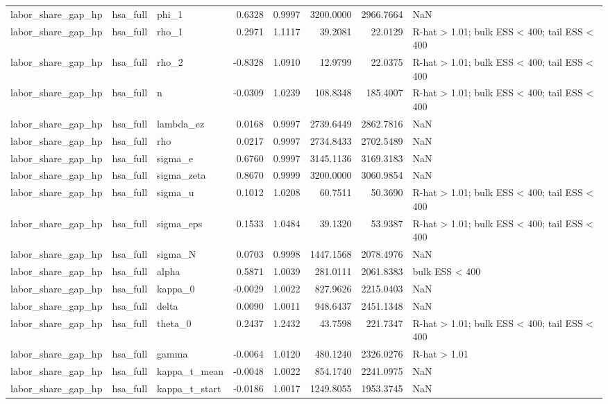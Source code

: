 \begin{tabular}{lllrrrrl}
labor\_share\_gap\_hp & hsa\_full & phi\_1 & 0.6328 & 0.9997 & 3200.0000 & 2966.7664 & NaN \\
labor\_share\_gap\_hp & hsa\_full & rho\_1 & 0.2971 & 1.1117 & 39.2081 & 22.0129 & R-hat > 1.01; bulk ESS < 400; tail ESS < 400 \\
labor\_share\_gap\_hp & hsa\_full & rho\_2 & -0.8328 & 1.0910 & 12.9799 & 22.0375 & R-hat > 1.01; bulk ESS < 400; tail ESS < 400 \\
labor\_share\_gap\_hp & hsa\_full & n & -0.0309 & 1.0239 & 108.8348 & 185.4007 & R-hat > 1.01; bulk ESS < 400; tail ESS < 400 \\
labor\_share\_gap\_hp & hsa\_full & lambda\_ez & 0.0168 & 0.9997 & 2739.6449 & 2862.7816 & NaN \\
labor\_share\_gap\_hp & hsa\_full & rho & 0.0217 & 0.9997 & 2734.8433 & 2702.5489 & NaN \\
labor\_share\_gap\_hp & hsa\_full & sigma\_e & 0.6760 & 0.9997 & 3145.1136 & 3169.3183 & NaN \\
labor\_share\_gap\_hp & hsa\_full & sigma\_zeta & 0.8670 & 0.9999 & 3200.0000 & 3060.9854 & NaN \\
labor\_share\_gap\_hp & hsa\_full & sigma\_u & 0.1012 & 1.0208 & 60.7511 & 50.3690 & R-hat > 1.01; bulk ESS < 400; tail ESS < 400 \\
labor\_share\_gap\_hp & hsa\_full & sigma\_eps & 0.1533 & 1.0484 & 39.1320 & 53.9387 & R-hat > 1.01; bulk ESS < 400; tail ESS < 400 \\
labor\_share\_gap\_hp & hsa\_full & sigma\_N & 0.0703 & 0.9998 & 1447.1568 & 2078.4976 & NaN \\
labor\_share\_gap\_hp & hsa\_full & alpha & 0.5871 & 1.0039 & 281.0111 & 2061.8383 & bulk ESS < 400 \\
labor\_share\_gap\_hp & hsa\_full & kappa\_0 & -0.0029 & 1.0022 & 827.9626 & 2215.0403 & NaN \\
labor\_share\_gap\_hp & hsa\_full & delta & 0.0090 & 1.0011 & 948.6437 & 2451.1348 & NaN \\
labor\_share\_gap\_hp & hsa\_full & theta\_0 & 0.2437 & 1.2432 & 43.7598 & 221.7347 & R-hat > 1.01; bulk ESS < 400; tail ESS < 400 \\
labor\_share\_gap\_hp & hsa\_full & gamma & -0.0064 & 1.0120 & 480.1240 & 2326.0276 & R-hat > 1.01 \\
labor\_share\_gap\_hp & hsa\_full & kappa\_t\_mean & -0.0048 & 1.0022 & 854.1740 & 2241.0975 & NaN \\
labor\_share\_gap\_hp & hsa\_full & kappa\_t\_start & -0.0186 & 1.0017 & 1249.8055 & 1953.3745 & NaN \\

\end{tabular}
